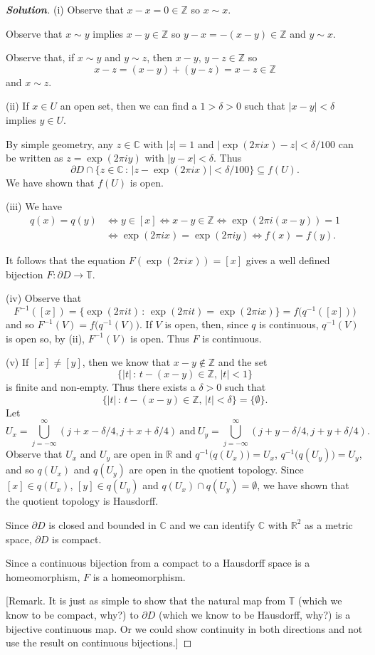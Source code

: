 \begin{proof}[\bf Solution] 
(i) Observe that $x-x=0\in{\mathbb Z}$ so $x\sim x$.

Observe that $x\sim y$ implies $x-y\in{\mathbb Z}$
so $y-x=-(x-y)\in{\mathbb Z}$ and $y\sim x$.

Observe that, if  $x\sim y$ and $y\sim z$, then $x-y,\,y-z\in{\mathbb Z}$
so 
\[x-z=(x-y)+(y-z)=x-z\in{\mathbb Z}\]
and $x\sim z$.

(ii) If $x\in U$ an open set, then we can find a $1>\delta>0$
such that $|x-y|<\delta$ implies $y\in U$.

By simple geometry, any $z\in{\mathbb C}$ with $|z|=1$ and 
$|\exp(2\pi ix)-z|<\delta/100$
can be written as $z=\exp(2\pi iy)$ with $|y-x|<\delta$.
Thus
\[\partial D\cap\{z\in{\mathbb C}\,:\,|z-\exp(2\pi ix)|<\delta/100\}
\subseteq f(U).\]
We have shown that $f(U)$ is open.

(iii) We have
\begin{align*}
q(x)=q(y)&\Leftrightarrow y\in[x] \Leftrightarrow
x-y\in{\mathbb Z} \Leftrightarrow
\exp(2\pi i(x-y))=1\\ 
&\Leftrightarrow \exp(2\pi ix)=\exp(2\pi iy)
\Leftrightarrow f(x)=f(y).
\end{align*}

It follows that the equation $F(\exp(2\pi ix))=[x]$ gives a well
defined bijection $F:{\partial}D\rightarrow{\mathbb T}$.

(iv) Observe that
\[F^{-1}([x])=\{\exp(2\pi it)\,:\,\exp(2\pi it)=\exp(2\pi ix)\}
=f\big(q^{-1}([x])\big)\]
and so $F^{-1}(V)=f\big(q^{-1}(V)\big)$. If $V$ is open,
then, since $q$ is continuous, $q^{-1}(V)$ is open so, by (ii),
$F^{-1}(V)$ is open. Thus $F$ is continuous.

(v) If $[x]\neq [y]$, then we know that $x-y\notin{\mathbb Z}$
and the set 
\[\{|t|\,:\,t-(x-y)\in{\mathbb Z},\,|t|<1\}\]
is finite and non-empty. Thus there exists a $\delta>0$
such that
\[\{|t|\,:\,t-(x-y)\in{\mathbb Z},\,|t|<\delta\}=\{\emptyset\}.\]
Let
\[U_{x}=\bigcup_{j=-\infty}^{\infty}(j+x-\delta/4,j+x+\delta/4)
\ \text{and}
\ U_{y}=\bigcup_{j=-\infty}^{\infty}(j+y-\delta/4,j+y+\delta/4).\]
Observe that $U_{x}$ and $U_{y}$ are open in ${\mathbb R}$
and $q^{-1}\big(q(U_{x}))=U_{x}$, $q^{-1}\big(q(U_{y}))=U_{y}$, 
and so $q(U_{x})$ and $q(U_{y})$ are open in the quotient topology.
Since $[x]\in q(U_{x})$, $[y]\in q(U_{y})$
and $q(U_{x})\cap q(U_{y})=\emptyset$,
we have shown that the quotient topology is Hausdorff.

Since ${\partial}D$ is closed and bounded in ${\mathbb C}$
and we can identify ${\mathbb C}$ with ${\mathbb R}^{2}$ as a metric
space, ${\partial}D$ is compact.

Since a continuous bijection from a compact to a Hausdorff space
is a homeomorphism, $F$ is a homeomorphism.

[Remark. It is just as simple to show that the natural
map from ${\mathbb T}$ (which we know to be compact, why?)
to ${\partial}D$ (which we know to be Hausdorff, why?)
is a bijective continuous map. Or we could show continuity
in both directions and not use the result on continuous bijections.]
\end{proof} 
